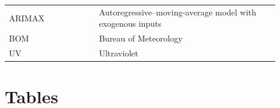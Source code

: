 \documentclass[mstat,12pt]{unswthesis}
\begin{document}
\begin{table}[H]
\begin{tabular}{p{0.3\linewidth} | p{0.6\linewidth}}
ARIMAX             & Autoregressive–moving-average model with exogenous inputs                                                        \\
BOM                & Bureau of Meteorology                                                                                            \\
UV                 & Ultraviolet                                                                                                      \\
\hline\hline
\end{tabular}
\end{table}

\hypertarget{tables}{%
\section*{\texorpdfstring{\textbf{Tables}}{Tables}}\label{tables}}
\end{document}

